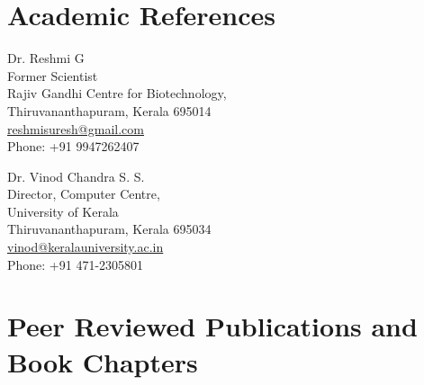 \documentclass[a4paper, 10pt]{article}
\begin{document}

\section*{Academic References}

\begin{minipage}[ht]{.50\textwidth}
Dr. Reshmi G \\
Former Scientist \\
Rajiv Gandhi Centre for Biotechnology, \\
Thiruvananthapuram, Kerala 695014 \\
\href{mailto:reshmisuresh@gmail.com}{reshmisuresh@gmail.com} \\
Phone: +91 9947262407
\end{minipage}
\begin{minipage}[ht]{.50\textwidth}
Dr. Vinod Chandra S. S. \\
Director, Computer Centre, \\
University of Kerala \\
Thiruvananthapuram, Kerala 695034\\
\href{mailto:vinod@keralauniversity.ac.in}{vinod@keralauniversity.ac.in} \\
Phone: +91 471-2305801
\end{minipage} \newpage


\section*{Peer Reviewed Publications and Book Chapters}
\end{document}
